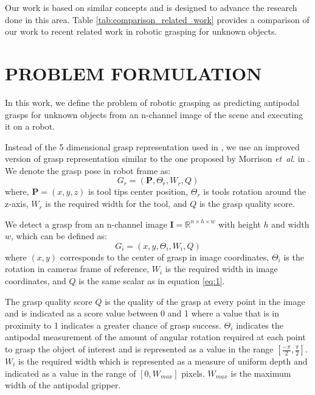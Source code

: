 \documentclass[letterpaper, 10pt, conference]{IEEEtran}
\newcommand{\etal}{\textit{et~al}. }
\begin{document}
Our work is based on similar concepts and is designed to advance the research done in this area. Table \ref{tab:comparison_related_work} provides a comparison of our work to recent related work in robotic grasping for unknown objects.



\section{PROBLEM FORMULATION}
In this work, we define the problem of robotic grasping as predicting antipodal grasps for unknown objects from an n-channel image of the scene and executing it on a robot.

Instead of the 5 dimensional grasp representation used in \cite{lenz2015deep, redmon2015real, kumra2017robotic}, we use an improved version of grasp representation similar to the one proposed by Morrison \etal in \cite{morrison2019learning}. We denote the grasp pose in robot frame as:
\begin{equation}\label{eq:1}
    G_r = (\textbf{P}, \Theta_r, W_r, Q) 
\end{equation}
where, $\textbf{P} = (x, y, z)$ is tool tip\textquotesingle s center position, $\Theta_r$ is tools rotation around the z-axis, $W_r$ is the required width for the tool, and $Q$ is the grasp quality score.

We detect a grasp from an n-channel image $\textbf{I} = \mathbb{R}^{n\times h \times w}$ with height $h$ and width $w$, which can be defined as:
\begin{equation}\label{eq:2}
    G_i = (x, y, \Theta_i, W_i, Q)
\end{equation}
where $(x, y)$ corresponds to the center of grasp in image coordinates, $\Theta_i$ is the rotation in camera\textquotesingle s frame of reference, $W_i$ is the required width in image coordinates, and $Q$ is the same scalar as in equation \eqref{eq:1}.

The grasp quality score $Q$ is the quality of the grasp at every point in the image and is indicated as a score value between 0 and 1 where a value that is in proximity to 1 indicates a greater chance of grasp success. $\Theta_i$ indicates the antipodal measurement of the amount of angular rotation required at each point to grasp the object of interest and is represented as a value in the range $[\frac{-\pi}{2}, \frac{\pi}{2}]$. $W_i$ is the required width which is represented as a measure of uniform depth and indicated as a value in the range of $[0, W_{max}]$ pixels. $W_{max}$ is the maximum width of the antipodal gripper.
\end{document}
